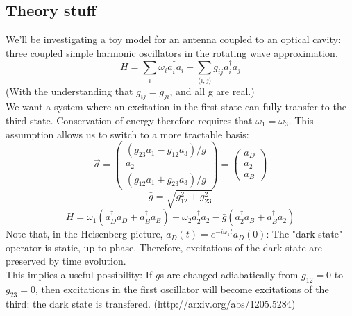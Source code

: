 \documentclass[final]{article}
\begin{document}
\subsection*{Theory stuff}
We'll be investigating a toy model for an antenna coupled to an optical cavity: three coupled simple harmonic oscillators in the rotating wave approximation.
\[H=\sum_i \omega_i a_i^\dagger a_i-\sum_{\langle i,j\rangle} g_{ij} a_i^\dagger a_j\]
(With the understanding that \(g_{ij}=g_{ji}\), and all g are real.)\\
We want a system where an excitation in the first state can fully transfer to the third state. Conservation of energy therefore requires that \(\omega_1=\omega_3\).
This assumption allows us to switch to a more tractable basis:
\[\vec a=\begin{pmatrix}(g_{23}a_1-g_{12}a_3)/\bar g\\a_2\\(g_{12}a_1+g_{23}a_3)/\bar g\end{pmatrix}=\begin{pmatrix}a_D\\a_2\\a_B\end{pmatrix}\]
\[\bar g=\sqrt{g_{12}^2+g_{23}^2}\]
\[H=\omega_1\left(a_D^\dagger a_D+a_B^\dagger a_B\right)+\omega_2a_2^\dagger a_2-\bar g\left(a_2^\dagger a_B+a_B^\dagger a_2\right)\]
Note that, in the Heisenberg picture, \(a_D(t)=e^{-i\omega_1 t} a_D(0)\): The "dark state" operator is static, up to phase.
Therefore, excitations of the dark state are preserved by time evolution.\\
This implies a useful possibility: If \(g\)s are changed adiabatically from \(g_{12}=0\) to \(g_{23}=0\), then excitations in the first oscillator will become excitations of the third: the dark state is transfered. (http://arxiv.org/abs/1205.5284)
\end{document}
